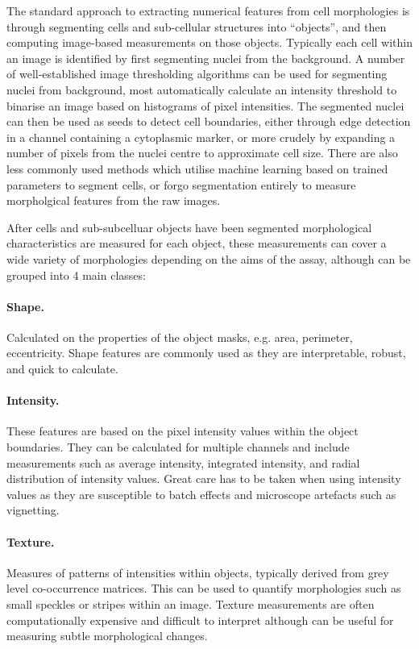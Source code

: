 \documentclass[a4paper,11pt,twoside,openright]{scrbook}
\begin{document}
The standard approach to extracting numerical features from cell morphologies is through segmenting cells and sub-cellular structures into ``objects'', and then computing image-based measurements on those objects.
Typically each cell within an image is identified by first segmenting nuclei from the background.
A number of well-established image thresholding algorithms can be used for segmenting nuclei from background, most automatically calculate an intensity threshold to binarise an image based on histograms of pixel intensities.\cite{Otsu1979,Padmanabhan2010}
The segmented nuclei can then be used as seeds to detect cell boundaries, either through edge detection in a channel containing a cytoplasmic marker, or more crudely by expanding a number of pixels from the nuclei centre to approximate cell size.
There are also less commonly used methods which utilise machine learning based on trained parameters to segment cells, \cite{Sommer2011} or forgo segmentation entirely to measure morpholgical features from the raw images. \cite{Rajaram2012,Orlov2008}

After cells and sub-subcelluar objects have been segmented morphological characteristics are measured for each object, these measurements can cover a wide variety of morphologies depending on the aims of the assay, although can be grouped into 4 main classes:

\paragraph{Shape.}
Calculated on the properties of the object masks, e.g. area, perimeter, eccentricity. Shape features are commonly used as they are interpretable, robust, and quick to calculate.

\paragraph{Intensity.}
These features are based on the pixel intensity values within the object boundaries.
They can be calculated for multiple channels and include measurements such as average intensity, integrated intensity, and radial distribution of intensity values.
Great care has to be taken when using intensity values as they are susceptible to batch effects and microscope artefacts such as vignetting. \cite{Goldman2010}

\paragraph{Texture.}
Measures of patterns of intensities within objects, typically derived from grey level co-occurrence matrices. \cite{Haralick1973} 
This can be used to quantify morphologies such as small speckles or stripes within an image.
Texture measurements are often computationally expensive and difficult to interpret although can be useful for measuring subtle morphological changes.
\end{document}
